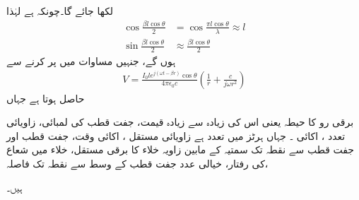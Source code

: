 لکھا جائے گا۔چونکہ  ہے لہٰذا 
\begin{align*}
\cos \frac{\beta l \cos \theta}{2}&=\cos \frac{\pi l \cos \theta}{\lambda}\approx l\\
\sin \frac{\beta l \cos \theta}{2}&\approx \frac{\beta l \cos \theta}{2}
\end{align*}
ہوں گے، جنہیں مساوات  میں پر کرنے سے
\begin{align}\label{مساوات_اینٹینا_غیر_سمتی_دباو_ت}
V=\frac{I_0 l e^{j(\omega t -\beta r)} \cos \theta}{4\pi \epsilon_0 c}\left(\frac{1}{r}+\frac{c}{j\omega r^2} \right)
\end{align}
حاصل ہوتا ہے جہاں
\begin{description}
 برقی رو کا حیطہ یعنی اس کی زیادہ سے زیادہ قیمت، 
 جفت قطب کی لمبائی، 
  زاویائی تعدد  ، اکائی ۔ جہاں ہرٹز میں تعدد  ہے
 زاویائی مستقل ، اکائی 
وقت، 
جفت قطب اور جفت قطب سے نقطہ  تک سمتیہ کے مابین زاویہ
خلاء کا برقی مستقل، 
خلاء میں شعاع کی رفتار، 
خیالی عدد 
جفت قطب کے وسط سے نقطہ  تک فاصلہ،
\end{description}
ہیں۔


